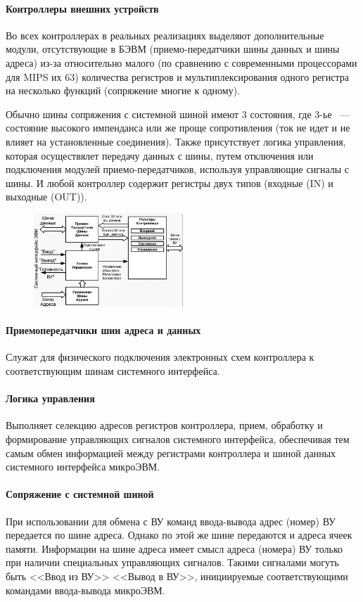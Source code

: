 \documentclass[10pt]{article}
\begin{document}
	\paragraph{Контроллеры внешних устройств}
	Во всех контроллерах в реальных реализациях выделяют дополнительные модули, отсутствующие в БЭВМ (приемо-передатчики шины данных и шины адреса) из-за относительно малого (по сравнению с современными процессорами для MIPS их 63) количества регистров и мультиплексирования одного регистра на несколько функций (сопряжение многие к одному).
	
	Обычно шины сопряжения с системной шиной имеют 3 состояния, где 3-ье ~--- состояние высокого импенданса или же проще сопротивления (ток не идет и не влияет на установленные соединения). Также присутствует логика управления, которая осуществялет передачу данных с шины, путем отключения или подключения модулей приемо-передатчиков, используя управляющие сигналы с шины. И любой контроллер содержит регистры двух типов (входные (IN) и выходные (OUT)).

	\begin{figure}[ht!]
		\centering
		\includegraphics[width=0.5\textwidth]{assets/images/ctrlod.png}
	\end{figure}
	\paragraph{Приемопередатчики шин адреса и данных}
	Служат для физического подключения электронных схем контроллера к соответствующим шинам системного интерфейса.
	\paragraph{Логика управления}
	Выполняет селекцию адресов регистров контроллера, прием, обработку и формирование управляющих сигналов системного интерфейса, обеспечивая тем самым обмен информацией между регистрами контроллера и шиной данных системного интерфейса микроЭВМ.
	\paragraph{Сопряжение с системной шиной}
	При использовании для обмена с ВУ команд ввода-вывода адрес (номер) ВУ передается по шине адреса. Однако по этой же шине передаются и адреса ячеек памяти. Информации на шине адреса имеет смысл адреса (номера) ВУ только при наличии специальных управляющих сигналов. Такими сигналами могуть быть <<Ввод из ВУ>> <<Вывод в ВУ>>, инициируемые соответствующими командами ввода-вывода микроЭВМ.
\end{document}
